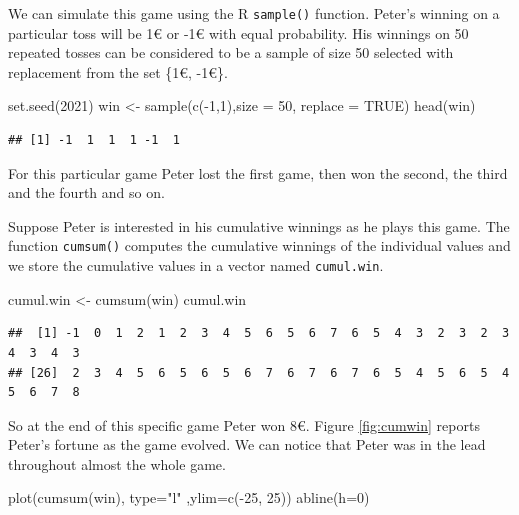 \documentclass[
]{book}
\newenvironment{Shaded}{\begin{snugshade}}{\end{snugshade}}
\newcommand{\AttributeTok}[1]{\textcolor[rgb]{0.77,0.63,0.00}{#1}}
\newcommand{\ConstantTok}[1]{\textcolor[rgb]{0.00,0.00,0.00}{#1}}
\newcommand{\DecValTok}[1]{\textcolor[rgb]{0.00,0.00,0.81}{#1}}
\newcommand{\FunctionTok}[1]{\textcolor[rgb]{0.00,0.00,0.00}{#1}}
\newcommand{\NormalTok}[1]{#1}
\newcommand{\OtherTok}[1]{\textcolor[rgb]{0.56,0.35,0.01}{#1}}
\newcommand{\SpecialCharTok}[1]{\textcolor[rgb]{0.00,0.00,0.00}{#1}}
\newcommand{\StringTok}[1]{\textcolor[rgb]{0.31,0.60,0.02}{#1}}
\theoremstyle{definition}
\theoremstyle{definition}
\theoremstyle{definition}
\theoremstyle{definition}
\theoremstyle{remark}
\begin{document}
We can simulate this game using the R \texttt{sample()} function. Peter's winning on a particular toss will be 1€ or -1€ with equal probability. His winnings on 50 repeated tosses can be considered to be a sample of size 50 selected with replacement from the set \{1€, -1€\}.

\begin{Shaded}
\begin{Highlighting}[]
\FunctionTok{set.seed}\NormalTok{(}\DecValTok{2021}\NormalTok{)}
\NormalTok{win }\OtherTok{\textless{}{-}} \FunctionTok{sample}\NormalTok{(}\FunctionTok{c}\NormalTok{(}\SpecialCharTok{{-}}\DecValTok{1}\NormalTok{,}\DecValTok{1}\NormalTok{),}\AttributeTok{size =} \DecValTok{50}\NormalTok{, }\AttributeTok{replace =} \ConstantTok{TRUE}\NormalTok{)}
\FunctionTok{head}\NormalTok{(win)}
\end{Highlighting}
\end{Shaded}

\begin{verbatim}
## [1] -1  1  1  1 -1  1
\end{verbatim}

For this particular game Peter lost the first game, then won the second, the third and the fourth and so on.

Suppose Peter is interested in his cumulative winnings as he plays this game. The function \texttt{cumsum()} computes the cumulative winnings of the individual values and we store the cumulative values in a vector named \texttt{cumul.win}.

\begin{Shaded}
\begin{Highlighting}[]
\NormalTok{cumul.win }\OtherTok{\textless{}{-}} \FunctionTok{cumsum}\NormalTok{(win) }
\NormalTok{cumul.win}
\end{Highlighting}
\end{Shaded}

\begin{verbatim}
##  [1] -1  0  1  2  1  2  3  4  5  6  5  6  7  6  5  4  3  2  3  2  3  4  3  4  3
## [26]  2  3  4  5  6  5  6  5  6  7  6  7  6  7  6  5  4  5  6  5  4  5  6  7  8
\end{verbatim}

So at the end of this specific game Peter won 8€. Figure \ref{fig:cumwin} reports Peter's fortune as the game evolved. We can notice that Peter was in the lead throughout almost the whole game.

\begin{Shaded}
\begin{Highlighting}[]
\FunctionTok{plot}\NormalTok{(}\FunctionTok{cumsum}\NormalTok{(win), }\AttributeTok{type=}\StringTok{"l"}\NormalTok{ ,}\AttributeTok{ylim=}\FunctionTok{c}\NormalTok{(}\SpecialCharTok{{-}}\DecValTok{25}\NormalTok{, }\DecValTok{25}\NormalTok{))}
\FunctionTok{abline}\NormalTok{(}\AttributeTok{h=}\DecValTok{0}\NormalTok{)}
\end{Highlighting}
\end{Shaded}
\end{document}
